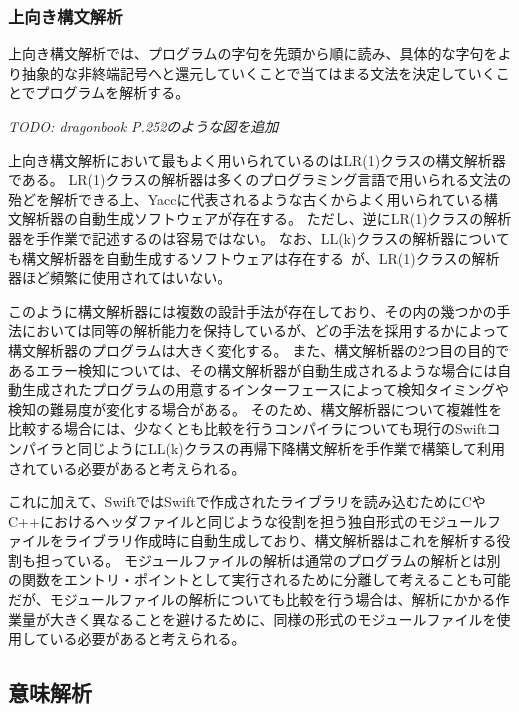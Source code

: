 \subsubsection{上向き構文解析}

上向き構文解析では、プログラムの字句を先頭から順に読み、具体的な字句をより抽象的な非終端記号へと還元していくことで当てはまる文法を決定していくことでプログラムを解析する。

\vspace{2em}
{\sl\small{TODO: dragonbook P.252のような図を追加}}
\vspace{2em}

上向き構文解析において最もよく用いられているのはLR(1)クラスの構文解析器である。
LR(1)クラスの解析器は多くのプログラミング言語で用いられる文法の殆どを解析できる上、Yaccに代表されるような古くからよく用いられている構文解析器の自動生成ソフトウェアが存在する。
ただし、逆にLR(1)クラスの解析器を手作業で記述するのは容易ではない。
なお、LL(k)クラスの解析器についても構文解析器を自動生成するソフトウェアは存在する~\cite{antlr}が、LR(1)クラスの解析器ほど頻繁に使用されてはいない。

\vspace{2em}

このように構文解析器には複数の設計手法が存在しており、その内の幾つかの手法においては同等の解析能力を保持しているが、どの手法を採用するかによって構文解析器のプログラムは大きく変化する。
また、構文解析器の2つ目の目的であるエラー検知については、その構文解析器が自動生成されるような場合には自動生成されたプログラムの用意するインターフェースによって検知タイミングや検知の難易度が変化する場合がある。
そのため、構文解析器について複雑性を比較する場合には、少なくとも比較を行うコンパイラについても現行のSwiftコンパイラと同じようにLL(k)クラスの再帰下降構文解析を手作業で構築して利用されている必要があると考えられる。

これに加えて、SwiftではSwiftで作成されたライブラリを読み込むためにCやC++におけるヘッダファイルと同じような役割を担う独自形式のモジュールファイルをライブラリ作成時に自動生成しており、構文解析器はこれを解析する役割も担っている。
モジュールファイルの解析は通常のプログラムの解析とは別の関数をエントリ・ポイントとして実行されるために分離して考えることも可能だが、モジュールファイルの解析についても比較を行う場合は、解析にかかる作業量が大きく異なることを避けるために、同様の形式のモジュールファイルを使用している必要があると考えられる。

\subsection{意味解析}
\label{refinement:structure:sema}

